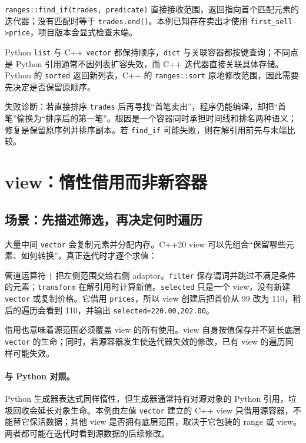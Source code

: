 \texttt{ranges::find\_if(trades, predicate)} 直接接收范围，返回指向首个匹配元素的迭代器；没有匹配时等于 \texttt{trades.end()}。本例已知存在卖出才使用 \texttt{first\_sell->price}，项目版本会显式检查末端。

\begin{pythonbridge}
Python \texttt{list} 与 C++ \texttt{vector} 都保持顺序，\texttt{dict} 与关联容器都按键查询；不同点是 Python 引用通常不因列表扩容失效，而 C++ 迭代器直接关联具体存储。Python 的 \texttt{sorted} 返回新列表，C++ 的 \texttt{ranges::sort} 原地修改范围，因此需要先决定是否保留原顺序。

\end{pythonbridge}

失败诊断：若直接排序 \texttt{trades} 后再寻找“首笔卖出”，程序仍能编译，却把“首笔”偷换为“排序后的第一笔”。根因是一个容器同时承担时间线和排名两种语义；修复是保留原序列并排序副本。若 \texttt{find\_if} 可能失败，则在解引用前先与末端比较。

\section{view：惰性借用而非新容器}

\subsection{场景：先描述筛选，再决定何时遍历}

大量中间 \texttt{vector} 会复制元素并分配内存。C++20 view 可以先组合“保留哪些元素、如何转换”，真正迭代时才逐个求值：



管道运算符 \texttt{|} 把左侧范围交给右侧 adaptor。\texttt{filter} 保存谓词并跳过不满足条件的元素；\texttt{transform} 在解引用时计算新值。\texttt{selected} 只是一个 view，没有新建 \texttt{vector} 或复制价格。它借用 \texttt{prices}，所以 view 创建后把首价从 99 改为 110，稍后的遍历会看到 110，并输出 \texttt{selected=220.00,202.00}。

借用也意味着源范围必须覆盖 view 的所有使用。view 自身按值保存并不延长底层 \texttt{vector} 的生命；同时，若源容器发生使迭代器失效的修改，已有 view 的遍历同样可能失效。

\paragraph{与 Python 对照。}
Python 生成器表达式同样惰性，但生成器通常持有对源对象的 Python 引用，垃圾回收会延长对象生命。本例由左值 \texttt{vector} 建立的 C++ view 只借用源容器，不能替它保活数据；其他 view 是否拥有底层范围，取决于它包装的 range 或 view。两者都可能在迭代时看到源数据的后续修改。

